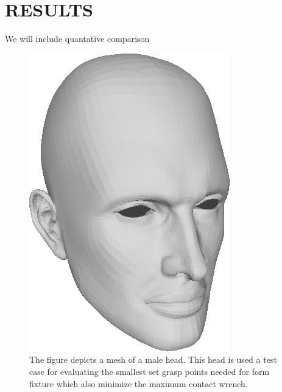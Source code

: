 
\section{RESULTS}
\label{sec:Results}

We will include quantative comparison 
\begin{figure}[t!]
  \begin{center}
    \includegraphics[width=0.65\linewidth]{images/maleHead}
  \end{center}
  \vspace{-10pt}
\caption{ The figure depicts a mesh of a male head. This head is used a test case for evaluating the smallest set grasp points needed for form fixture which also minimize the maximum contact wrench.}
  \vspace*{-10pt}
  \label{fig:maleHead}
\end{figure}

